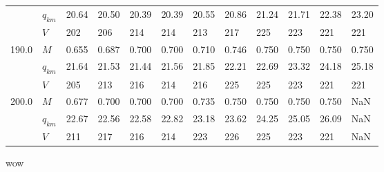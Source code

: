 \documentclass{article}
\begin{document}
\begin{tabular}{llllllllllll}
      & $q_{km}$ &  20.64  &                   20.50  &  20.39 \cellcolor{green} &                   20.39  &                   20.55  &                   20.86  &                   21.24  &                   21.71  &  22.38  &  23.20  \\
      & $V$ &    202  &                     206  &    214 \cellcolor{green} &                     214  &                     213  &                     217  &                     225  &                     223  &    221  &    221  \\
190.0 & $M$ &  0.655  &                   0.687  &  0.700 \cellcolor{green} &                   0.700  &                   0.710  &                   0.746  &                   0.750  &                   0.750  &  0.750  &  0.750  \\
      & $q_{km}$ &  21.64  &                   21.53  &  21.44 \cellcolor{green} &                   21.56  &                   21.85  &                   22.21  &                   22.69  &                   23.32  &  24.18  &  25.18  \\
      & $V$ &    205  &                     213  &    216 \cellcolor{green} &                     214  &                     216  &                     225  &                     225  &                     223  &    221  &    221  \\
200.0 & $M$ &  0.677  &  0.700 \cellcolor{green} &                   0.700  &                   0.700  &                   0.735  &                   0.750  &                   0.750  &                   0.750  &  0.750  &     NaN \\
      & $q_{km}$ &  22.67  &  22.56 \cellcolor{green} &                   22.58  &                   22.82  &                   23.18  &                   23.62  &                   24.25  &                   25.05  &  26.09  &     NaN \\
      & $V$ &    211  &    217 \cellcolor{green} &                     216  &                     214  &                     223  &                     226  &                     225  &                     223  &    221  &     NaN \\
\bottomrule
\end{tabular}
wow
\end{document}
